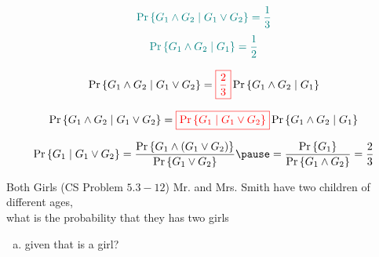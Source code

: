 \begin{frame}{}
  \[
    \textcolor{teal}{\Pr\left\{G_1 \land G_2 \mid G_1 \lor G_2\right\} = \frac{1}{3}}
  \]
  \[
    \textcolor{teal}{\Pr\left\{G_1 \land G_2 \mid G_1\right\} = \frac{1}{2}}
  \]

  \pause
  \[
    \Pr\left\{G_1 \land G_2 \mid G_1 \lor G_2\right\} = \textcolor{red}{\boxed{\frac{2}{3}}} \Pr\left\{G_1 \land G_2 \mid G_1\right\}
  \]

  \pause
  \[
    \Pr\left\{G_1 \land G_2 \mid G_1 \lor G_2\right\} = \textcolor{red}{\boxed{\Pr\left\{G_1 \mid G_1 \lor G_2\right\}}} \Pr\left\{G_1 \land G_2 \mid G_1\right\}
  \]

  \pause
  \[
    \Pr\set{G_1 \mid G_1 \lor G_2} = \frac{\Pr\set{G_1 \land (G_1 \lor G_2)}}{\Pr\set{G_1 \lor G_2}} 
    \pause = \frac{\Pr\set{G_1}}{\Pr\set{G_1 \land G_2}} = \frac{2}{3}
  \]
\end{frame}

\begin{frame}{}

  \pause
\end{frame}

\begin{frame}{}
  \begin{exampleblock}{Both Girls (CS Problem $5.3-12$)}
    Mr. and Mrs. Smith have two children of different ages,\\
    what is the probability that they has two girls
    \begin{enumerate}[(a)]
      \item given that  is a girl?
    \end{enumerate}
  \end{exampleblock}

  \pause
  \vspace{0.50cm}
  \centerline{}
\end{frame}

